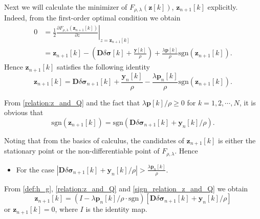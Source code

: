 \documentclass[lettersize,journal]{IEEEtran}
\def\y{\mathbf{y}}
\def\z{\mathbf{z}}
\def\D{\mathbf{D}}
\def\p{\partial}
\def\bfp{\mathbf{p}}
\def\f{\frac}
\def\bmsigma{\bm{\sigma}}
\newcommand{\sgn}[1]{\mathrm{sgn}(#1)}
\begin{document}
Next we will calculate the minimizer of $F_{\rho,\lambda}(\z[k])$, $\z_{n+1}[k]$ explicitly. Indeed, from the first-order optimal condition we obtain
\begin{equation*}
\begin{split}
  0& = \left.\f{1}{2}\f{\p F_{\rho,\lambda}(\z_{n+1}[k])}{\p z}\right|_{z = \z_{n+1}[k]} \\
  &= \z_{n+1}[k]-\left(\D\delta\bmsigma[k]+\f{\y[k]}{\rho}\right) + \f{\lambda\bfp[k]}{\rho}\sgn{\z_{n+1}[k]}.
\end{split}
\end{equation*}
Hence $\z_{n+1}[k]$ satisfies the following identity
\begin{equation}\label{relation:z_and_Q}
  \z_{n+1}[k] = \D\delta\bmsigma_{n+1}[k]+\f{\y_n[k]}{\rho} - \f{\lambda\bfp_n[k]}{\rho}\sgn{\z_{n+1}[k]}.
\end{equation}

From \eqref{relation:z_and_Q} and the fact that $\lambda \bfp[k]/\rho\geq 0$ for $k=1,2,\cdots,N$, it is obvious that
\begin{equation}\label{sign_relation_z_and_Q}
\sgn{\z_{n+1}[k]} = \sgn{\D\delta\bmsigma_{n+1}[k]+\y_n[k]/\rho}.
\end{equation}

Noting that from the basics of calculus, the candidates of $\z_{n+1}[k]$ is either the stationary point or the non-differentiable point of $F_{\rho,\lambda}$. Hence

\begin{itemize}
\item For the case $|\D\delta\bmsigma_{n+1}[k]+\y_n[k]/\rho|>\f{\lambda \bfp_n[k]}{\rho}$.
\end{itemize}
From \eqref{def:h_g}, \eqref{relation:z_and_Q} and \eqref{sign_relation_z_and_Q} we obtain
\begin{equation*}
  \z_{n+1}[k] = (I - \lambda \bfp_n[k]/\rho\cdot\mbox{sgn})[\D\delta\bmsigma_{n+1}[k]+\y_n[k]/\rho]
\end{equation*}
or $\z_{n+1}[k] = 0$, where $I$ is the identity map.
\end{document}
